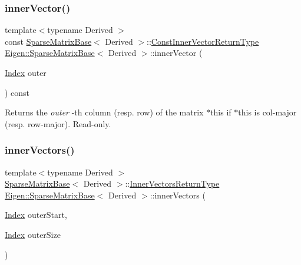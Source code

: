 \subsubsection{\texorpdfstring{innerVector()}{innerVector()}\hspace{0.1cm}{\footnotesize\ttfamily [2/2]}}
{\footnotesize\ttfamily template$<$typename Derived $>$ \\
const \mbox{\hyperlink{class_eigen_1_1_sparse_matrix_base}{Sparse\+Matrix\+Base}}$<$ Derived $>$\+::\mbox{\hyperlink{class_eigen_1_1_block}{Const\+Inner\+Vector\+Return\+Type}} \mbox{\hyperlink{class_eigen_1_1_sparse_matrix_base}{Eigen\+::\+Sparse\+Matrix\+Base}}$<$ Derived $>$\+::inner\+Vector (\begin{DoxyParamCaption}\item[{\mbox{\hyperlink{struct_eigen_1_1_eigen_base_a554f30542cc2316add4b1ea0a492ff02}{Index}}}]{outer }\end{DoxyParamCaption}) const}

\begin{DoxyReturn}{Returns}
the {\itshape outer} -\/th column (resp. row) of the matrix {\ttfamily $\ast$this} if {\ttfamily $\ast$this} is col-\/major (resp. row-\/major). Read-\/only. 
\end{DoxyReturn}
\mbox{\label{class_eigen_1_1_sparse_matrix_base_a3c51bf5a7eb18eab9a85949d03aed14a}} 
\subsubsection{\texorpdfstring{innerVectors()}{innerVectors()}\hspace{0.1cm}{\footnotesize\ttfamily [1/2]}}
{\footnotesize\ttfamily template$<$typename Derived $>$ \\
\mbox{\hyperlink{class_eigen_1_1_sparse_matrix_base}{Sparse\+Matrix\+Base}}$<$ Derived $>$\+::\mbox{\hyperlink{class_eigen_1_1_block}{Inner\+Vectors\+Return\+Type}} \mbox{\hyperlink{class_eigen_1_1_sparse_matrix_base}{Eigen\+::\+Sparse\+Matrix\+Base}}$<$ Derived $>$\+::inner\+Vectors (\begin{DoxyParamCaption}\item[{\mbox{\hyperlink{struct_eigen_1_1_eigen_base_a554f30542cc2316add4b1ea0a492ff02}{Index}}}]{outer\+Start,  }\item[{\mbox{\hyperlink{struct_eigen_1_1_eigen_base_a554f30542cc2316add4b1ea0a492ff02}{Index}}}]{outer\+Size }\end{DoxyParamCaption})}

